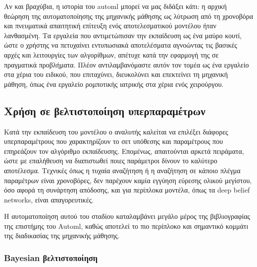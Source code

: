 \documentclass{article}
\begin{document}
Αν και βραχύβια, η ιστορία του automl μπορεί να μας διδάξει κάτι: η αρχική θεώρηση της αυτοματοποίησης της μηχανικής μάθησης ως λύτρωση  από τη χρονοβόρα και πνευματικά απαιτητική επίτευξη ενός αποτελεσματικού μοντέλου ήταν λανθασμένη. Τα εργαλεία που αντιμετώπισαν την εκπαίδευση ως ένα μαύρο κουτί, ώστε ο χρήστης να πετυχαίνει εντυπωσιακά αποτελέσματα αγνοώντας τις βασικές αρχές και λειτουργίες των αλγορίθμων, απέτυχε κατά την εφαρμογή της σε πραγματικά προβλήματα. Πλέον αντιλαμβανόμαστε αυτόν τον τομέα ως ένα εργαλείο στα χέρια του ειδικού, που επιταχύνει, διευκολύνει και επεκτείνει τη μηχανική μάθηση, όπως ένα  εργαλείο ρομποτικής ιατρικής στα χέρια ενός χειρούργου. 

\subsection{Χρήση σε βελτιστοποίηση υπερπαραμέτρων}
Κατά την εκπαίδευση του μοντέλου ο αναλυτής καλείται να επιλέξει διάφορες υπερπαραμέτρους που χαρακτηρίζουν το σετ υπόθεσης και παραμέτρους που επηρεάζουν τον αλγόριθμο εκπαίδευσης. Επομένως, απαιτούνται αρκετά πειράματα, ώστε με επαλήθευση να διαπιστωθεί ποιες παράμετροι δίνουν το καλύτερο αποτέλεσμα. Τεχνικές όπως η τυχαία αναζήτηση ή η αναζήτηση σε κάποιο πλέγμα παραμέτρων είναι χρονοβόρες, δεν παρέχουν καμία εγγύηση εύρεσης ολικού μεγίστου, όσο αφορά τη συνάρτηση απόδοσης, και για περίπλοκα μοντέλα, όπως τα deep belief networks, είναι απαγορευτικές.

Η αυτοματοποίηση αυτού του σταδίου καταλαμβάνει μεγάλο μέρος της βιβλιογραφίας της επιστήμης του Automl, καθώς αποτελεί το πιο περίπλοκο και σημαντικό κομμάτι της διαδικασίας της μηχανικής μάθησης.

\subsubsection{Bayesian βελτιστοποίηση}
\end{document}
